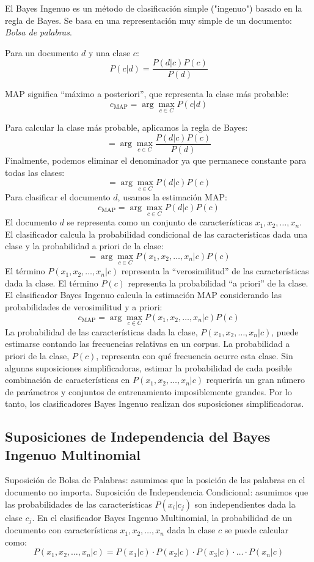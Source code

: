 El Bayes Ingenuo es un método de clasificación simple ("ingenuo") basado en la regla de Bayes. Se basa en una representación muy simple de un documento: \textit{Bolsa de palabras}.

Para un documento $d$ y una clase $c$:
\[
P(c | d) = \frac{P(d | c)P(c)}{P(d)}
\]

MAP significa ``máximo a posteriori'', que representa la clase más probable:
    \[
    c_{\text{MAP}} = \arg\max_{c \in C} P(c | d)
    \]

Para calcular la clase más probable, aplicamos la regla de Bayes:
    \[
    = \arg\max_{c \in C} \frac{P(d | c)P(c)}{P(d)}
    \]
Finalmente, podemos eliminar el denominador ya que permanece constante para todas las clases:
    \[
    = \arg\max_{c \in C} P(d | c)P(c)
    \]
Para clasificar el documento $d$, usamos la estimación MAP:
    \[
    c_{\text{MAP}} = \arg\max_{c \in C} P(d | c)P(c)
    \]
El documento $d$ se representa como un conjunto de características $x_1, x_2, \ldots, x_n$.  El clasificador calcula la probabilidad condicional de las características dada una clase y la probabilidad a priori de la clase:
    \[
    = \arg\max_{c \in C} P(x_1, x_2, \ldots, x_n | c)P(c)
    \]
El término $P(x_1, x_2, \ldots, x_n | c)$ representa la ``verosimilitud'' de las características dada la clase. El término $P(c)$ representa la probabilidad ``a priori'' de la clase. El clasificador Bayes Ingenuo \cite{mccallum1998comparison} calcula la estimación MAP considerando las probabilidades de verosimilitud y a priori:
    \[
    c_{\text{MAP}} = \arg\max_{c \in C} P(x_1, x_2, \ldots, x_n | c)P(c)
    \]
La probabilidad de las características dada la clase, $P(x_1, x_2, \ldots, x_n | c)$, puede estimarse contando las frecuencias relativas en un corpus. La probabilidad a priori de la clase, $P(c)$, representa con qué frecuencia ocurre esta clase. Sin algunas suposiciones simplificadoras, estimar la probabilidad de cada posible combinación de características en $P(x_1, x_2, \ldots, x_n | c)$ requeriría un gran número de parámetros y conjuntos de entrenamiento imposiblemente grandes. Por lo tanto, los clasificadores Bayes Ingenuo realizan dos suposiciones simplificadoras.


\subsection{Suposiciones de Independencia del Bayes Ingenuo Multinomial}
Suposición de Bolsa de Palabras: asumimos que la posición de las palabras en el documento no importa. Suposición de Independencia Condicional: asumimos que las probabilidades de las características $P(x_i | c_j)$ son independientes dada la clase $c_j$.  En el clasificador Bayes Ingenuo Multinomial, la probabilidad de un documento con características $x_1, x_2, \ldots, x_n$ dada la clase $c$ se puede calcular como:
    \[
    P(x_1, x_2, \ldots, x_n | c) = P(x_1 | c) \cdot P(x_2 | c) \cdot P(x_3 | c) \cdot \ldots \cdot P(x_n | c)
    \]

